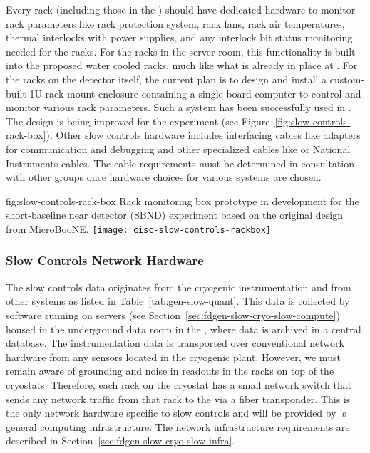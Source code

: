 Every rack (including those in the ) should have dedicated hardware to monitor rack parameters like rack protection system, rack fans, rack air temperatures, thermal interlocks with power supplies, and any interlock bit status monitoring needed for the racks. For the racks in the  server room, this functionality is built into the proposed water cooled racks, much like what is already in place at .  For the racks on the detector itself, the current plan is to design and install a custom-built 1U rack-mount enclosure containing a single-board computer to control and monitor various rack parameters. Such a system has been successfully used in . The design is being improved for the  experiment (see Figure~\ref{fig:slow-controls-rack-box}). Other slow controls hardware includes interfacing cables like adapters for communication and debugging and other specialized cables like  
or National Instruments cables. The cable requirements must be determined in consultation with other groups once hardware choices for various systems are chosen.

\begin{dunefigure}{fig:slow-controls-rack-box}
{Rack monitoring box prototype in development for the short-baseline near detector (SBND) experiment based on the original design from MicroBooNE.}
\texttt{[image: cisc-slow-controls-rackbox]}
\end{dunefigure}


\subsubsection{Slow Controls Network Hardware}
\label{sec:fdgen-slow-cryo-slow-network}
The slow controls data originates from the cryogenic instrumentation and from other systems as listed in Table~\ref{tab:gen-slow-quant}. This data is collected by software running on servers
(see Section~\ref{sec:fdgen-slow-cryo-slow-compute})
housed in the underground data room in the ,
where data is archived in a central  database.
The instrumentation data is transported over
conventional network hardware from any sensors located in the cryogenic
plant.  However, we must remain aware of grounding and noise in readouts in the racks on top of the
cryostats.  Therefore, each
rack on the cryostat has a small network switch that sends
any network traffic from that rack to the  via a fiber transponder.
This is the only network hardware specific to slow controls and will be provided by %
\surf{}'s  
general computing infrastructure. %
The network infrastructure requirements are described in
Section~\ref{sec:fdgen-slow-cryo-slow-infra}.

